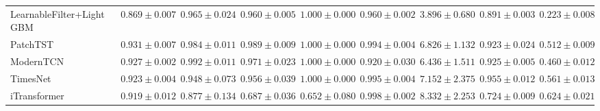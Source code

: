 \begin{table}[t]
{\begin{tabular}{lcccccccc}
LearnableFilter+LightGBM & $0.869 \pm 0.007$ & $0.965 \pm 0.024$ & $0.960 \pm 0.005$ & $1.000 \pm 0.000$ & $0.960 \pm 0.002$ & $3.896 \pm 0.680$ & $0.891 \pm 0.003$ & $0.223 \pm 0.008$ \\
PatchTST & $0.931 \pm 0.007$ & $0.984 \pm 0.011$ & $0.989 \pm 0.009$ & $1.000 \pm 0.000$ & $0.994 \pm 0.004$ & $6.826 \pm 1.132$ & $0.923 \pm 0.024$ & $0.512 \pm 0.009$ \\
ModernTCN & $0.927 \pm 0.002$ & $0.992 \pm 0.011$ & $0.971 \pm 0.023$ & $1.000 \pm 0.000$ & $0.920 \pm 0.030$ & $6.436 \pm 1.511$ & $0.925 \pm 0.005$ & $0.460 \pm 0.012$ \\
TimesNet & $0.923 \pm 0.004$ & $0.948 \pm 0.073$ & $0.956 \pm 0.039$ & $1.000 \pm 0.000$ & $0.995 \pm 0.004$ & $7.152 \pm 2.375$ & $0.955 \pm 0.012$ & $0.561 \pm 0.013$ \\
iTransformer & $0.919 \pm 0.012$ & $0.877 \pm 0.134$ & $0.687 \pm 0.036$ & $0.652 \pm 0.080$ & $0.998 \pm 0.002$ & $8.332 \pm 2.253$ & $0.724 \pm 0.009$ & $0.624 \pm 0.021$ \\
\bottomrule
\end{tabular}%
}
\end{table}

